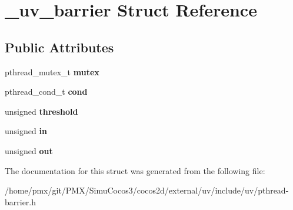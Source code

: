 \hypertarget{struct__uv__barrier}{}\section{\+\_\+uv\+\_\+barrier Struct Reference}
\label{struct__uv__barrier}
\subsection*{Public Attributes}
\begin{DoxyCompactItemize}
\item 
\mbox{\label{struct__uv__barrier_a6b74e2cb96f6fc6df7f09e7d1d4b0531}} 
pthread\+\_\+mutex\+\_\+t {\bfseries mutex}
\item 
\mbox{\label{struct__uv__barrier_a8526dcab57295affbb9dd8faef9b7941}} 
pthread\+\_\+cond\+\_\+t {\bfseries cond}
\item 
\mbox{\label{struct__uv__barrier_a8c810bd66da0b964158f06896c139e2c}} 
unsigned {\bfseries threshold}
\item 
\mbox{\label{struct__uv__barrier_aebf4cee858f2792fb804e209e8a5af9e}} 
unsigned {\bfseries in}
\item 
\mbox{\label{struct__uv__barrier_a6ce3e97b1f30ae4da9cdf0ec0a9f385b}} 
unsigned {\bfseries out}
\end{DoxyCompactItemize}


The documentation for this struct was generated from the following file\+:\begin{DoxyCompactItemize}
\item 
/home/pmx/git/\+P\+M\+X/\+Simu\+Cocos3/cocos2d/external/uv/include/uv/pthread-\/barrier.\+h\end{DoxyCompactItemize}
